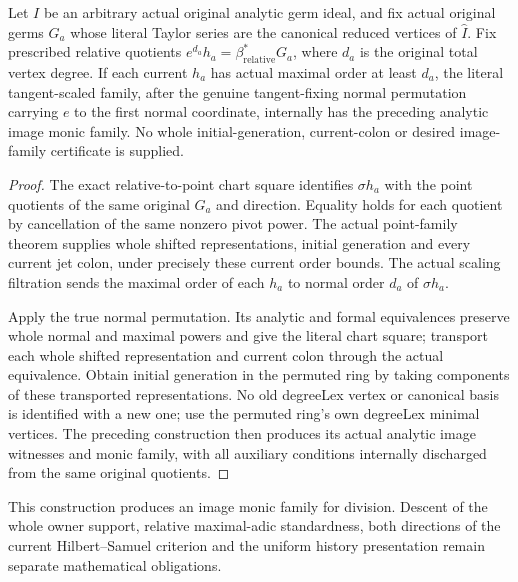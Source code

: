 \begin{theorem}
\label{hir:actual-original-relative-current-image-monic-family}
\leanok
Let $I$ be an arbitrary actual original analytic germ ideal, and fix
actual original germs $G_a$ whose literal Taylor series are the canonical
reduced vertices of $\widehat I$. Fix prescribed
relative quotients $e^{d_a}h_a=\beta_{\mathrm{relative}}^*G_a$, where
$d_a$ is the original total vertex degree. If each current $h_a$ has
actual maximal order at least $d_a$, the literal tangent-scaled family,
after the genuine tangent-fixing normal permutation carrying $e$ to the
first normal coordinate, internally has the preceding analytic image monic
family. No whole initial-generation, current-colon or desired image-family
certificate is supplied.
\end{theorem}
\begin{proof}
The exact relative-to-point chart square identifies $\sigma h_a$ with
the point quotients of the same original $G_a$ and direction. Equality
holds for each quotient by cancellation of the same nonzero pivot power.
The actual point-family theorem supplies whole shifted representations,
initial generation and every current jet colon, under precisely these
current order bounds. The actual scaling filtration sends the maximal
order of each $h_a$ to normal order $d_a$ of $\sigma h_a$.

Apply the true normal permutation. Its analytic and formal equivalences
preserve whole normal and maximal powers and give the literal chart square;
transport each whole shifted representation and current colon through the
actual equivalence. Obtain initial generation in the permuted ring by taking
components of these transported representations. No old degreeLex vertex
or canonical basis is identified with a new one; use the permuted ring's
own degreeLex minimal vertices. The preceding construction then produces
its actual analytic image witnesses and monic family, with all auxiliary
conditions internally discharged from the same original quotients.
\end{proof}

This construction produces an image monic family for division. Descent of the
whole owner support, relative maximal-adic standardness, both directions of the
current Hilbert--Samuel criterion and the uniform history presentation remain
separate mathematical obligations.
